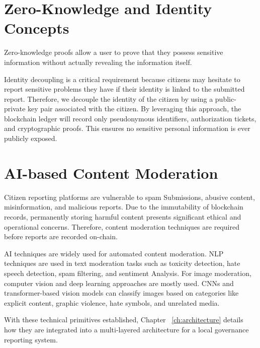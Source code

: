 \section{Zero-Knowledge and Identity Concepts}

Zero-knowledge proofs allow a user to prove that they possess sensitive information without actually revealing the information itself. 

Identity decoupling is a critical requirement because citizens may hesitate to report sensitive problems they have if their identity is linked to the submitted report. Therefore, we decouple the identity of the citizen by using a public-private key pair associated with the citizen. By leveraging this approach, the blockchain ledger will record only pseudonymous identifiers, authorization tickets, and cryptographic proofs. This ensures no sensitive personal information is ever publicly exposed.

\section{AI-based Content Moderation}

Citizen reporting platforms are vulnerable to spam Submissions, abusive content, misinformation, and malicious reports. Due to the immutability of blockchain records, permanently storing harmful content presents significant ethical and operational concerns. Therefore, content moderation techniques are required before reports are recorded on-chain. 

\ac{AI} techniques are widely used for automated content moderation. \ac{NLP} techniques are used in text moderation tasks such as toxicity detection, hate speech detection, spam filtering, and sentiment Analysis. For image moderation, computer vision and deep learning approaches are mostly used. \ac{CNN}s and transformer-based vision models can classify images based on categories like explicit content, graphic violence, hate symbols, and unrelated media. 

With these technical primitives established, Chapter ~\ref{ch:architecture} details how they are integrated into a multi-layered architecture for a local governance reporting system.
